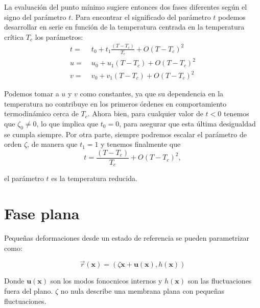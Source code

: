 La evaluación del punto mínimo sugiere entonces dos fases diferentes según el
signo del parámetro $t$. Para encontrar el significado del parámetro $t$
podemos desarrollar en serie en función de la temperatura centrada en la
temperatura crítica $T_c$ los parámetros:
\begin{align}
t=&\; t_0+t_1\frac{(T-T_c)}{T_c}+O(T-T_c)^2\\
u=&\; u_0+u_1(T-T_c)+O(T-T_c)^2\\
v=&\; v_0+v_1(T-T_c)+O(T-T_c)^2
\end{align}

Podemos tomar a $u$ y $v$ como constantes, ya que su dependencia en la 
temperatura no contribuye en los primeros órdenes en comportamiento
termodinámico cerca de $T_c$. Ahora bien,
para cualquier valor de $t\!<\!0$ tenemos que $\zeta_0\!\neq\! 0$, lo que  
implica que $t_0=0$, para asegurar que esta última desigualdad se cumpla
siempre. Por otra parte, siempre podremos escalar el parámetro de orden
$\zeta$, de manera que $t_1=1$ y tenemos finalmente que
\begin{equation}
t=\frac{(T-T_c)}{T_c}+O(T-T_c)^2,
\end{equation}

el parámetro $t$ es la temperatura reducida.


 
\section{Fase plana}

Pequeñas deformaciones desde un estado de referencia se pueden parametrizar
como:

\begin{equation}
\vec{r}(\mathbf{x})=(\zeta \mathbf{x}+\mathbf{u(\mathbf{x})},h(\mathbf{x}))
\end{equation}

Donde $\mathbf{u(\mathbf{x})}$ son los modos fonocnicos internos y
$h(\mathbf{x})$ son las fluctuaciones fuera del plano.
$\zeta$ no nula describe una membrana plana con pequeñas fluctuaciones.

